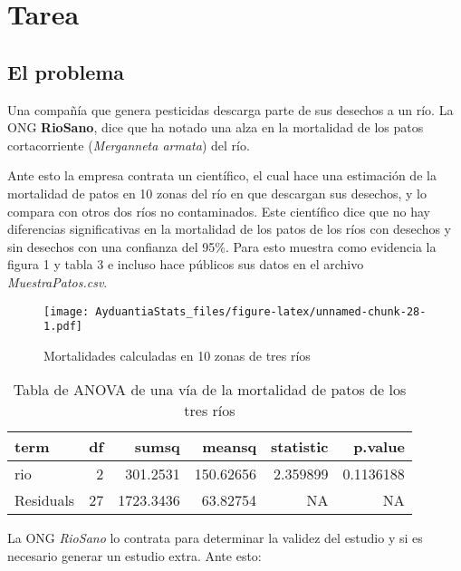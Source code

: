 \documentclass[]{book}
\begin{document}
\hypertarget{tarea}{%
\section{Tarea}\label{tarea}}

\hypertarget{el-problema}{%
\subsection{El problema}\label{el-problema}}

Una compañía que genera pesticidas descarga parte de sus desechos a un río. La ONG \textbf{RioSano}, dice que ha notado una alza en la mortalidad de los patos cortacorriente (\emph{Merganneta armata}) del río.

Ante esto la empresa contrata un científico, el cual hace una estimación de la mortalidad de patos en 10 zonas del río en que descargan sus desechos, y lo compara con otros dos ríos no contaminados. Este científico dice que no hay diferencias significativas en la mortalidad de los patos de los ríos con desechos y sin desechos con una confianza del 95\%. Para esto muestra como evidencia la figura 1 y tabla 3 e incluso hace públicos sus datos en el archivo \emph{MuestraPatos.csv}.

\begin{figure}
\centering
\texttt{[image: AyduantiaStats\_files/figure-latex/unnamed-chunk-28-1.pdf]}
\caption{\label{fig:unnamed-chunk-28}Mortalidades calculadas en 10 zonas de tres ríos}
\end{figure}

\begin{table}

\caption{\label{tab:unnamed-chunk-29}Tabla de ANOVA de una vía de la mortalidad de patos de los tres ríos}
\centering
\begin{tabular}[t]{l|r|r|r|r|r}
\hline
term & df & sumsq & meansq & statistic & p.value\\
\hline
rio & 2 & 301.2531 & 150.62656 & 2.359899 & 0.1136188\\
\hline
Residuals & 27 & 1723.3436 & 63.82754 & NA & NA\\
\hline
\end{tabular}
\end{table}

La ONG \emph{RioSano} lo contrata para determinar la validez del estudio y si es necesario generar un estudio extra. Ante esto:
\end{document}
